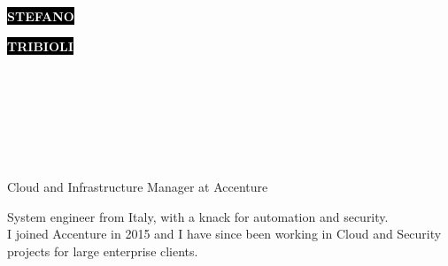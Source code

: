 \documentclass[9pt]{developercv}
\begin{document}
\begin{minipage}[t]{0.42\textwidth}
	\vspace{-\baselineskip}
	
	\colorbox{black}{{\HUGE\textcolor{white}{\textbf{\MakeUppercase{Stefano}}}}}
	
	\colorbox{black}{{\HUGE\textcolor{white}{\textbf{\MakeUppercase{Tribioli}}}}}
\end{minipage}
\begin{minipage}[t]{0.29\textwidth}
	\vspace{-\baselineskip}
	
	\\
	\\	
\end{minipage}
\begin{minipage}[t]{0.29\textwidth}
	\vspace{-\baselineskip}
	
	\\
	\\
	\\
\end{minipage}

\begin{minipage}[t]{1\textwidth}
\vspace{6pt}
\LARGE Cloud and Infrastructure Manager at Accenture
\end{minipage}


\begin{minipage}[t]{1\textwidth}
	\vspace{-\baselineskip}
	System engineer from Italy, with a knack for automation and security.
	\\
	I joined Accenture in 2015 and I have since been working in Cloud and Security projects for large enterprise clients.
\end{minipage}

\end{document}
